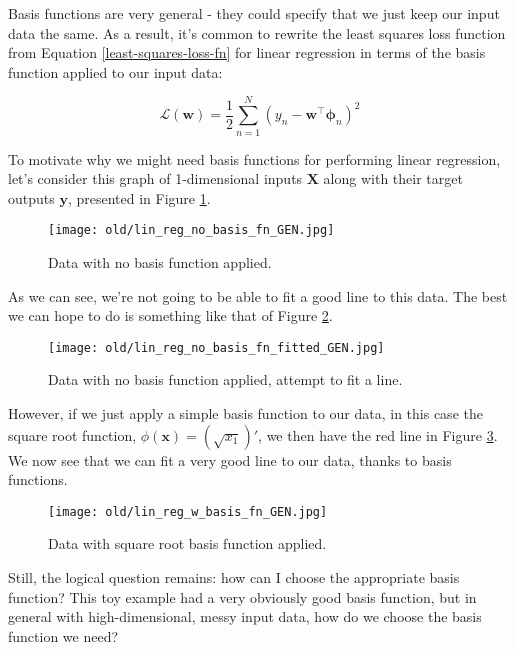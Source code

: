 Basis functions are very general - they could specify that we just keep our input data the same. As a result, it's common to rewrite the least squares loss function from Equation \ref{least-squares-loss-fn} for linear regression in terms of the basis function applied to our input data:

\begin{equation} \label{least-squares-loss-fn-w-basis}
    \mathcal{L}(\mathbf{w}) = \frac{1}{2} \sum_{n=1}^{N} (y_n - \mathbf{w}^\top\boldsymbol{\phi}_n)^2
\end{equation}

To motivate why we might need basis functions for performing linear regression, let's consider this graph of 1-dimensional inputs $\mathbf{X}$ along with their target outputs $\mathbf{y}$, presented in Figure \ref{fig:lin-reg-no-basis-fn}.

\begin{figure}
    \centering
    \texttt{[image: old/lin\_reg\_no\_basis\_fn\_GEN.jpg]}
    \caption{Data with no basis function applied.}
    \label{fig:lin-reg-no-basis-fn}
\end{figure}

As we can see, we're not going to be able to fit a good line to this data. The best we can hope to do is something like that of Figure \ref{fig:lin-reg-no-basis-fn-fitted}.

\begin{figure}
    \centering
    \texttt{[image: old/lin\_reg\_no\_basis\_fn\_fitted\_GEN.jpg]}
    \caption{Data with no basis function applied, attempt to fit a line.}
    \label{fig:lin-reg-no-basis-fn-fitted}
\end{figure}

However, if we just apply a simple basis function to our data, in this case the square root function, $\phi(\mathbf{x}) = (\sqrt{x_1})'$, we then have the red line in Figure \ref{fig:lin-reg-w-basis-fn-fitted}. We now see that we can fit a very good line to our data, thanks to basis functions.

\begin{figure}
    \centering
    \texttt{[image: old/lin\_reg\_w\_basis\_fn\_GEN.jpg]}
    \caption{Data with square root basis function applied.}
    \label{fig:lin-reg-w-basis-fn-fitted}
\end{figure}

Still, the logical question remains: how can I choose the appropriate basis function? This toy example had a very obviously good basis function, but in general with high-dimensional, messy input data, how do we choose the basis function we need?

